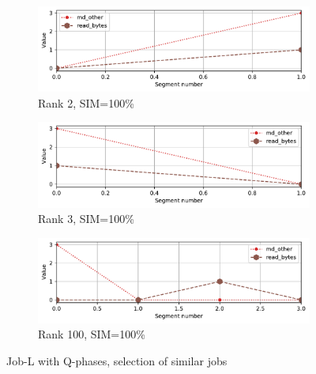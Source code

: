 \documentclass{jhps}
\begin{document}
\begin{figure}[bt]
\begin{subfigure}{0.3\textwidth}
\centering
\includegraphics[width=\textwidth]{job_similarities_7488914-out/hex_phases-1.0000--14timeseries4577917}
\caption{Rank 2, SIM=100\%}
\end{subfigure}
\begin{subfigure}{0.3\textwidth}
\centering
\includegraphics[width=\textwidth]{job_similarities_7488914-out/hex_phases-1.0000--1timeseries4405671}
\caption{Rank 3, SIM=100\%}
\end{subfigure}
\begin{subfigure}{0.3\textwidth}
\centering
\includegraphics[width=\textwidth]{job_similarities_7488914-out/hex_phases-1.0000--99timeseries4232293}
\caption{Rank 100, SIM=100\%}
\end{subfigure}

\caption{Job-L with Q-phases, selection of similar jobs}%
\label{fig:job-L-hex-phases}
\end{figure}
\end{document}
